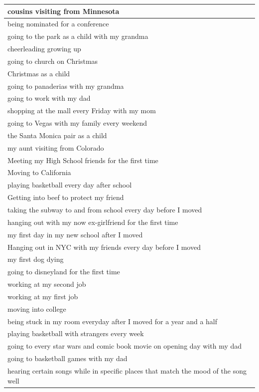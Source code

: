 \documentclass[
  .7em,
  letterpaper,
  DIV=11,
  numbers=noendperiod]{scrartcl}
\begin{document}
\begin{table}
\begin{tabular}{l}
\hline
cousins visiting from Minnesota\\
\hline
being nominated for a conference\\
\hline
going to the park as a child with my grandma\\
\hline
cheerleading growing up\\
\hline
going to church on Christmas\\
\hline
Christmas as a child\\
\hline
going to panaderias with my grandma\\
\hline
going to work with my dad\\
\hline
shopping at the mall every Friday with my mom\\
\hline
going to Vegas with my family every weekend\\
\hline
the Santa Monica pair as a child\\
\hline
my aunt visiting from Colorado\\
\hline
Meeting my High School friends for the first time\\
\hline
Moving to California\\
\hline
playing basketball every day after school\\
\hline
Getting into beef to protect my friend\\
\hline
taking the subway to and from school every day before I moved\\
\hline
hanging out with my now ex-girlfriend for the first time\\
\hline
my first day in my new school after I moved\\
\hline
Hanging out in NYC with my friends every day before I moved\\
\hline
my first dog dying\\
\hline
going to disneyland for the first time\\
\hline
working at my second job\\
\hline
working at my first job\\
\hline
moving into college\\
\hline
being stuck in my room everyday after I moved for a year and a half\\
\hline
playing basketball with strangers every week\\
\hline
going to every star wars and comic book movie on opening day with my dad\\
\hline
going to basketball games with my dad\\
\hline
hearing certain songs while in specific places that match the mood of the song well\\

\end{tabular}
\end{table}
\end{document}
